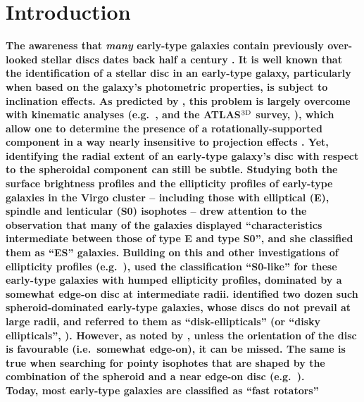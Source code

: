 \documentclass[useAMS,usenatbib,article]{mnras}
\begin{document}
\section{Introduction}
\label{sec:int}
{\bf The awareness that \emph{many} early-type galaxies contain previously over-looked stellar discs dates back half a century 
\citep{liller1966,stromstrom1978,michard1984,djorgovski1985,jedrzejewski1987,BenderMoellenhoff1987,
carter1987,capaccioli1987,capaccioli1988}. 
It is well known that 
the identification of a stellar disc in an early-type galaxy, particularly when based on the galaxy's photometric properties, 
is subject to inclination effects. 
As predicted by \cite{carter1987}, this problem is largely overcome with kinematic analyses 
(e.g.~\citealt{franx1989,nieto1991,rixwhite1992,cinzanovandermarel1993,donofrio1995,graham1998fornax}, 
and the ATLAS$^{\rm 3D}$ survey, \citealt{cappellari2011}), 
which allow one to determine the presence of a rotationally-supported component 
in a way nearly insensitive to projection effects \citep{mcelroy1983,cappellari2007,emsellem2007}. 
Yet, identifying the radial extent of an early-type galaxy's disc with respect to the spheroidal component can still be subtle. 
Studying both the surface brightness profiles and the ellipticity profiles 
of early-type galaxies in the Virgo cluster -- including those with elliptical (E), spindle and lenticular (S0) isophotes -- 
\cite{liller1966} drew attention to the observation that many of the galaxies displayed 
``characteristics intermediate between those of type E and type S0'', 
and she classified them as ``ES'' galaxies.  
Building on this and other investigations of ellipticity profiles (e.g.~\citealt{stromstrom1978,ditullio1979}), 
\cite{michard1984} used the classification ``S0-like'' for these early-type galaxies with humped ellipticity profiles, 
dominated by a somewhat edge-on disc at intermediate radii.  
\cite{nieto1988} identified two dozen such spheroid-dominated early-type galaxies, 
whose discs do not prevail at large radii, 
and referred to them as ``disk-ellipticals'' (or ``disky ellipticals'', \citealt{simienmichard1990}).   
However, as noted by \cite{nieto1988}, unless the orientation of the disc is favourable 
(i.e.~somewhat edge-on), it can be missed.  
The same is true when searching for pointy isophotes that are shaped by the combination of the spheroid and a near edge-on disc 
(e.g.~\citealt{carter1978,carter1987,jedrzejewski1987,ebneter1987,BenderMoellenhoff1987,bender1988,bijaoui1989}). \\
Today, most early-type galaxies are classified as ``fast rotators'' 
}
\end{document}

